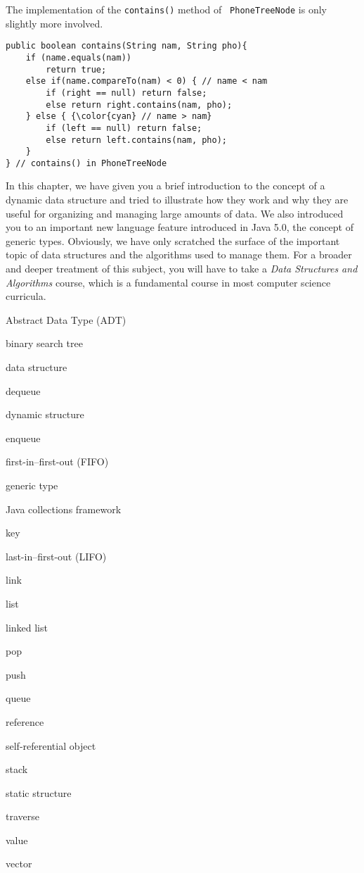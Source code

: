 \noindent The implementation of the {\tt contains()} method of {\tt
PhoneTreeNode} is only slightly more involved.

\begin{jjjlisting}
\begin{lstlisting}
public boolean contains(String nam, String pho){
    if (name.equals(nam))
        return true;
    else if(name.compareTo(nam) < 0) { // name < nam
        if (right == null) return false;
        else return right.contains(nam, pho);
    } else { {\color{cyan} // name > nam}
        if (left == null) return false;
        else return left.contains(nam, pho);
    }
} // contains() in PhoneTreeNode
\end{lstlisting}
\end{jjjlisting}

\pagebreak
{}
\label{chapter-summary}


In this chapter, we have given you a brief introduction to the concept of a
dynamic data structure and tried to illustrate how they work and why
they are useful for organizing and managing large amounts of data. We
also introduced you to an important new language feature introduced in
Java 5.0, the concept of generic types.  Obviously, we have only
scratched the surface of the important topic of data structures and
the algorithms used to manage them.  For a broader and deeper
treatment of this subject, you will have to take a {\em Data
Structures and Algorithms} course, which is a fundamental course in
most computer science curricula.

\label{technical-terms}
\begin{KT}
Abstract Data Type (ADT)

binary search tree

data structure

dequeue

dynamic structure

enqueue

first-in--first-out (FIFO)

generic type

Java collections framework

key

last-in--first-out (LIFO)

link

list

linked list

pop

push

queue

reference

self-referential object

stack

static structure

traverse

value

vector

\end{KT}

